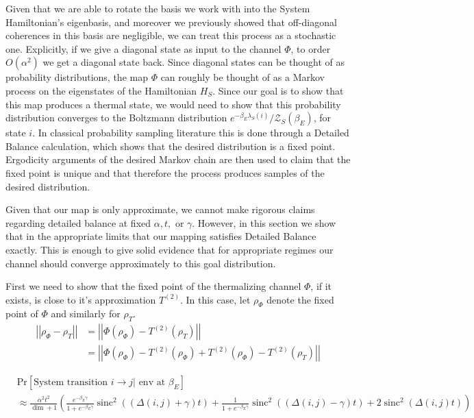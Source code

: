 \documentclass{article}
\newcommand{\parens}[1]{\left( #1 \right)}
\newcommand{\norm}[1]{\left| \left| #1 \right| \right|}
\newcommand{\prob}[1]{\text{Pr}\left[ #1 \right]}
\newcommand{\bigo}[1]{O\left( #1 \right)}
\newcommand{\partfun}{\mathcal{Z}}
\DeclareMathOperator{\sinc}{sinc}
\begin{document}
Given that we are able to rotate the basis we work with into the System Hamiltonian's eigenbasis, and moreover we previously showed that off-diagonal coherences in this basis are negligible, we can treat this process as a stochastic one. Explicitly, if we give a diagonal state as input to the channel $\Phi$, to order $\bigo{\alpha^2}$ we get a diagonal state back. Since diagonal states can be thought of as probability distributions, the map $\Phi$ can roughly be thought of as a Markov process on the eigenstates of the Hamiltonian $H_S$. Since our goal is to show that this map produces a thermal state,
we would need to show that this probability distribution converges to the Boltzmann distribution $e^{-\beta_E \lambda_S(i)} / \partfun_S(\beta_E)$, for state $i$. In classical probability sampling literature this is done through a Detailed Balance calculation, which shows that the desired distribution is a fixed point. Ergodicity arguments of the desired Markov chain are then used to claim that the fixed point is unique and that therefore the process produces samples of the desired distribution.

Given that our map is only approximate, we cannot make rigorous claims regarding detailed balance at fixed $\alpha, t,$ or $\gamma$. However, in this section we show that in the appropriate limits that our mapping satisfies Detailed Balance exactly. This is enough to give solid evidence that for appropriate regimes our channel should converge approximately to this goal distribution.


First we need to show that the fixed point of the thermalizing channel $\Phi$, if it exists, is close to it's approximation $T^{(2)}$. In this case, let $\rho_{\Phi}$ denote the fixed point of $\Phi$ and similarly for $\rho_T$.
\begin{align}
    \norm{\rho_{\Phi} - \rho_T} &= \norm{\Phi(\rho_{\Phi}) - T^{(2)}(\rho_T)} \\
    &= \norm{\Phi(\rho_{\Phi}) - T^{(2)}(\rho_{\Phi}) + T^{(2)}(\rho_{\Phi}) - T^{(2)}(\rho_T)}
\end{align}


\begin{align}
    &\prob{\text{System transition } i \to j | \text{ env at } \beta_E} \nonumber \\
    &\approx \frac{\alpha^2 t^2}{\dim + 1} \parens {\frac{e^{-\beta_E \gamma}}{1 + e^{-\beta_E \gamma}}  \sinc^2((\Delta(i,j) + \gamma)t) + \frac{1}{1 + e^{-\beta_E \gamma}} \sinc^2 ((\Delta(i,j) - \gamma)t) + 2 \sinc^2(\Delta(i,j) t)} \nonumber
\end{align}
\end{document}
